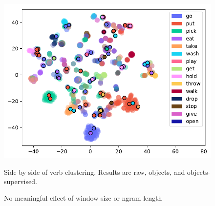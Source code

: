 \documentclass[11pt]{article}
\begin{document}
\begin{figure}[ht!]
{\label{fig:first}%
\includegraphics[width=0.5\linewidth]{figures/cluster_viz_VERB_objects_supervised}}%
%
\caption{Side by side of verb clustering. Results are raw, objects, and objects-supervised.}
\end{figure}


\begin{figure}[ht!]
\centering
{}%
%
\caption{No meaningful effect of window size or ngram length}
\end{figure}
\end{document}
